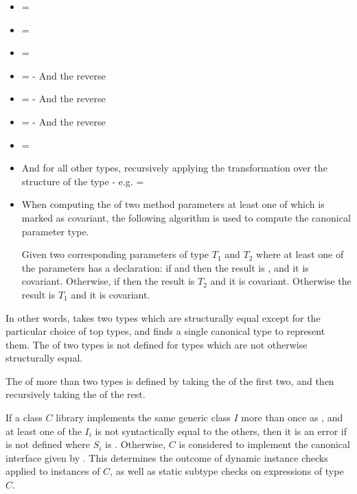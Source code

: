 \documentclass[makeidx]{article}
\begin{document}
\begin{itemize}
\item {} = 
\item \TopMergeType{\DYNAMIC}{\DYNAMIC} = \code{\DYNAMIC}
\item \TopMergeType{\VOID}{\VOID} = \code{\VOID}
\item {} = 
   - And the reverse
\item \TopMergeType{\DYNAMIC}{\VOID} = 
   - And the reverse
\item {} = 
   - And the reverse
\item {} = 
\item And for all other types, recursively applying the transformation over the
  structure of the type
  - e.g.  = 
\item When computing the \TopMergeTypeName{} of two method parameters at least one of
  which is marked as covariant, the following algorithm is used to compute the
  canonical parameter type.

  Given two corresponding parameters of type $T_1$ and $T_2$ where at least
  one of the parameters has a \COVARIANT{} declaration:
  if  and  then the result is ,
     and it is covariant.
  Otherwise, if  then the result is $T_2$ and it is covariant.
  Otherwise the result is $T_1$ and it is covariant.
\end{itemize}

In other words, \TopMergeTypeName{} takes two types which are structurally equal
except for the particular choice of top types, and
finds a single canonical type to represent them.
The \TopMergeTypeName{} of two types is not defined for
types which are not otherwise structurally equal.

The \TopMergeTypeName{} of more than two types is defined by taking the
\TopMergeTypeName{} of the first two, and then recursively taking the
\TopMergeTypeName{} of the rest.

If a class $C$ library implements the same generic class $I$ more
than once as , and at least one of the $I_i$ is not syntactically
equal to the others, then it is an error if  is not
defined where $S_i$ is .  Otherwise, $C$ is considered to
implement the canonical interface given by . This
determines the outcome of dynamic instance checks applied to instances of $C$,
as well as static subtype checks on expressions of type $C$.
\end{document}
